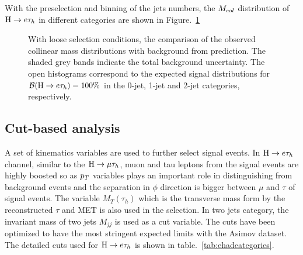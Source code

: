 With the preselection and binning of the jets numbers, the $M_{col}$ distribution of $\mathrm{H} \to e \tau_{h}$ in different categories are shown in Figure.~\ref{fig:etauCol_preselection}
\begin{figure}[hbtp]\centering
 \caption{With loose selection conditions, the comparison of the observed collinear mass distributions with background from prediction. The shaded grey bands indicate the total background uncertainty.
The open histograms correspond to the expected signal distributions for $\mathcal{B}(\mathrm{H} \to e \tau_{h})=100\%$ in the  0-jet, 1-jet and 2-jet categories, respectively.}
\label{fig:etauCol_preselection}\end{figure}


\subsection{Cut-based analysis}
A set of kinematics variables are used to further select signal events. In $\mathrm{H} \to e \tau_{h}$ channel, similar to the $\mathrm{H}\to \mu\tau_{h}$, muon and tau leptons from the signal events are highly boosted so as $p_{T}$ variables plays an important role in distinguishing from background events and the separation in $\phi$ direction is bigger between $\mu$ and $\tau$ of signal events. The variable $M_{T}(\tau_{h})$ which is the transverse mass form by the reconstructed $\tau$ and MET is also used in the selection. In two jets category, the invariant mass of two jets $M_{jj}$ is used as a cut variable.  The cuts have been optimized to have the most stringent expected limits with the Asimov dataset. The detailed cuts used for $\mathrm{H} \to e \tau_{h}$ is shown in table.~\ref{tab:ehadcategories}.


